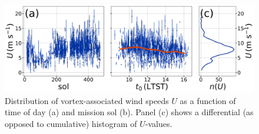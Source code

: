 \documentclass{aastex63}
\begin{document}

\begin{figure}
    \centering
    \includegraphics[width=\textwidth]{figures/U_vs_t0-sol_hist.png}
    \caption{Distribution of vortex-associated wind speeds $U$ as a function of time of day (a) and mission sol (b). Panel (c) shows a differential (as opposed to cumulative) histogram of $U$-values.}
    \label{fig:U_vs_t0-sol_hist}
\end{figure}
\end{document}
